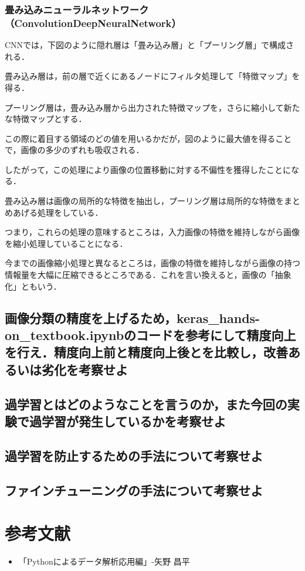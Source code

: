 \documentclass[uplatex,titlepage]{jsarticle}
\newif\iffigure
\begin{document}
\subsubsection{畳み込みニューラルネットワーク（ConvolutionDeepNeuralNetwork）}
CNNでは，下図のように隠れ層は「畳み込み層」と「プーリング層」で構成される．\par
畳み込み層は，前の層で近くにあるノードにフィルタ処理して「特徴マップ」を得る．\par
プーリング層は，畳み込み層から出力された特徴マップを，さらに縮小して新たな特徴マップとする．\par
この際に着目する領域のどの値を用いるかだが，図のように最大値を得ることで，画像の多少のずれも吸収される．\par
したがって，この処理により画像の位置移動に対する不偏性を獲得したことになる．
\iffigure
\begin{figure}[H]%
    \begin{center}
    \texttt{[image: CNN\_model.png]} 
    \caption{畳み込みニューラルネットワーク}
    \end{center}
\end{figure}
\fi
畳み込み層は画像の局所的な特徴を抽出し，プーリング層は局所的な特徴をまとめあげる処理をしている．\par
つまり，これらの処理の意味するところは，入力画像の特徴を維持しながら画像を縮小処理していることになる．\par
今までの画像縮小処理と異なるところは，画像の特徴を維持しながら画像の持つ情報量を大幅に圧縮できるところである．これを言い換えると，画像の「抽象化」ともいう．

\iffigure
\begin{figure}[H]%
    \begin{center}
    \texttt{[image: CNN\_model2.png]} 
    \caption{畳み込みニューラルネットワーク2}
    \end{center}
\end{figure}
\fi

\subsection{画像分類の精度を上げるため，keras\_hands-on\_textbook.ipynbのコードを参考にして精度向上を行え．精度向上前と精度向上後とを比較し，改善あるいは劣化を考察せよ}


\subsection{過学習とはどのようなことを言うのか，また今回の実験で過学習が発生しているかを考察せよ}


\subsection{過学習を防止するための手法について考察せよ}


\subsection{ファインチューニングの手法について考察せよ}


\section{参考文献}
\begin{itemize}
  \item 「Pythonによるデータ解析応用編」-矢野 昌平
\end{itemize}
\end{document}
